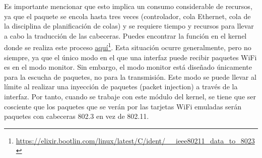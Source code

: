 Es importante mencionar que esto implica un consumo considerable de recursos, ya que el paquete se encola hasta tres veces (controlador, cola Ethernet, cola de la disciplina de planificación de colas) y se requiere tiempo y recursos para llevar a cabo la traducción de las cabeceras. Puedes encontrar la función en el kernel donde se realiza este proceso \href{https://elixir.bootlin.com/linux/latest/C/ident/__ieee80211_data_to_8023}{aquí}\footnote{\url{https://elixir.bootlin.com/linux/latest/C/ident/__ieee80211_data_to_8023}}. Esta situación ocurre generalmente, pero no siempre, ya que el único modo en el que una interfaz puede recibir paquetes WiFi es en el modo monitor. Sin embargo, el modo monitor está diseñado únicamente para la escucha de paquetes, no para la transmisión. Este modo se puede llevar al límite al realizar una inyección de paquetes (packet injection) a través de la interfaz. Por tanto, cuando se trabaje con este módulo del kernel, se tiene que ser cosciente que los paquetes que se verán por las tarjetas WiFi emuladas serán paquetes con cabeceras 802.3 en vez de 802.11. 